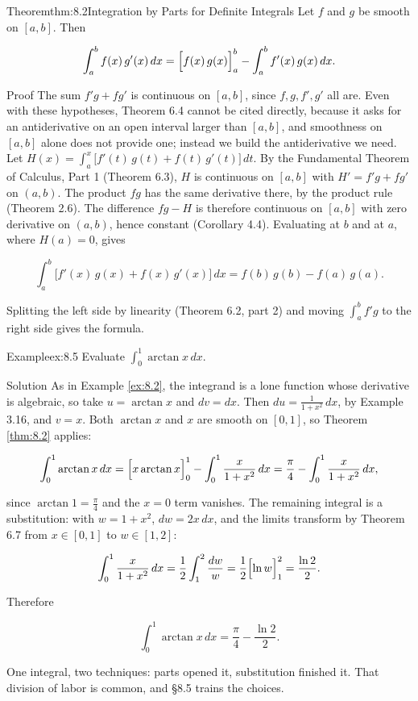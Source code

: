\documentclass[a4paper,12pt,oneside]{memoir}
\begin{document}
\begin{envtheorem}{Theorem}{thm:8.2}{Integration by Parts for Definite Integrals}
Let \(f\) and \(g\) be smooth on \([a, b]\). Then

\[ \int_{a}^{b} f(x)\,g'(x)\,dx = \Bigl[f(x)\,g(x)\Bigr]_{a}^{b} - \int_{a}^{b} f'(x)\,g(x)\,dx. \]
\end{envtheorem}
\begin{envproof}{Proof}{}{}
The sum \(f'g + fg'\) is continuous on \([a, b]\), since \(f, g, f', g'\) all are. Even with these hypotheses, Theorem 6.4 cannot be cited directly, because it asks for an antiderivative on an open interval larger than \([a, b]\), and smoothness on \([a, b]\) alone does not provide one; instead we build the antiderivative we need. Let \(H(x) = \int_{a}^{x} \bigl[f'(t)\,g(t) + f(t)\,g'(t)\bigr]\,dt\). By the Fundamental Theorem of Calculus, Part 1 (Theorem 6.3), \(H\) is continuous on \([a, b]\) with \(H' = f'g + fg'\) on \((a, b)\). The product \(fg\) has the same derivative there, by the product rule (Theorem 2.6). The difference \(fg - H\) is therefore continuous on \([a, b]\) with zero derivative on \((a, b)\), hence constant (Corollary 4.4). Evaluating at \(b\) and at \(a\), where \(H(a) = 0\), gives

\[ \int_{a}^{b} \bigl[f'(x)\,g(x) + f(x)\,g'(x)\bigr]\,dx = f(b)\,g(b) - f(a)\,g(a). \]

Splitting the left side by linearity (Theorem 6.2, part 2) and moving \(\int_{a}^{b} f'g\) to the right side gives the formula. \qedmark
\end{envproof}
\begin{workedexample}
\begin{envexample}{Example}{ex:8.5}{}
Evaluate \(\displaystyle\int_{0}^{1} \arctan x\,dx\).
\end{envexample}
\begin{envsolution}{Solution}{}{}
As in Example \ref{ex:8.2}, the integrand is a lone function whose derivative is algebraic, so take \(u = \arctan x\) and \(dv = dx\). Then \(du = \tfrac{1}{1+x^{2}}\,dx\), by Example 3.16, and \(v = x\). Both \(\arctan x\) and \(x\) are smooth on \([0, 1]\), so Theorem \ref{thm:8.2} applies:

\[ \int_{0}^{1} \arctan x\,dx = \Bigl[x\arctan x\Bigr]_{0}^{1} - \int_{0}^{1} \frac{x}{1+x^{2}}\,dx = \frac{\pi}{4} - \int_{0}^{1} \frac{x}{1+x^{2}}\,dx, \]

since \(\arctan 1 = \tfrac{\pi}{4}\) and the \(x = 0\) term vanishes. The remaining integral is a substitution: with \(w = 1 + x^{2}\), \(dw = 2x\,dx\), and the limits transform by Theorem 6.7 from \(x \in [0, 1]\) to \(w \in [1, 2]\):

\[ \int_{0}^{1} \frac{x}{1+x^{2}}\,dx = \frac{1}{2}\int_{1}^{2} \frac{dw}{w} = \frac{1}{2}\Bigl[\ln w\Bigr]_{1}^{2} = \frac{\ln 2}{2}. \]

Therefore

\[ \int_{0}^{1} \arctan x\,dx = \frac{\pi}{4} - \frac{\ln 2}{2}. \]

One integral, two techniques: parts opened it, substitution finished it. That division of labor is common, and §8.5 trains the choices. \qedmark
\end{envsolution}
\end{workedexample}
\end{document}
